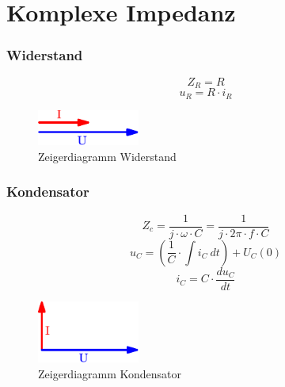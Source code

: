



\section{Komplexe Impedanz}

\subsubsection{Widerstand}
\[ Z_R = R \]
\[ u_R = R \cdot i_R \]
\begin{figure}[h!]
	\centering
	\includegraphics[width=0.3\textwidth]{zeig_ui_wid.pdf}
	\caption{Zeigerdiagramm Widerstand}
	\label{fig:zeig_ui_wid}
\end{figure}

\subsubsection{Kondensator}
\[ Z_c = \frac{1}{j \cdot \omega \cdot C} = \frac{1}{j \cdot 2 \pi \cdot f \cdot C} \]
\[ u_C = \left( \frac{1}{C} \cdot \int i_C ~ dt \right) + U_C(0) \]
\[ i_C = C \cdot \frac{du_C}{dt} \]
\begin{figure}[h!]
	\centering
	\includegraphics[width=0.3\textwidth]{zeig_ui_kap.pdf}
	\caption{Zeigerdiagramm Kondensator}
	\label{fig:zeig_ui_kap}
\end{figure}

